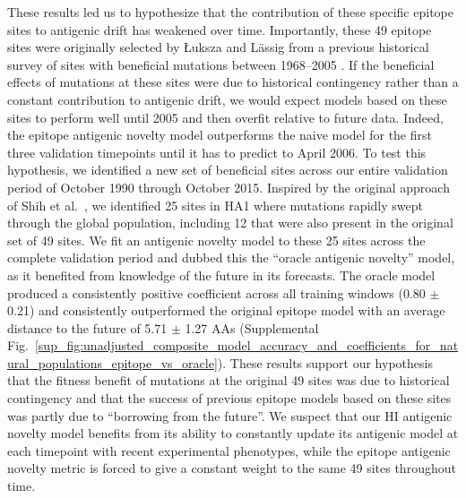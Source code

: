 These results led us to hypothesize that the contribution of these specific epitope sites to antigenic drift has weakened over time.
Importantly, these 49 epitope sites were originally selected by {\L}uksza and L\"assig \cite{Luksza:2014hj} from a previous historical survey of sites with beneficial mutations between 1968--2005 \cite{Shih:2007bd}.
If the beneficial effects of mutations at these sites were due to historical contingency rather than a constant contribution to antigenic drift, we would expect models based on these sites to perform well until 2005 and then overfit relative to future data.
Indeed, the epitope antigenic novelty model outperforms the naive model for the first three validation timepoints until it has to predict to April 2006.
To test this hypothesis, we identified a new set of beneficial sites across our entire validation period of October 1990 through October 2015.
Inspired by the original approach of Shih et al.~\cite{Shih:2007bd}, we identified 25 sites in HA1 where mutations rapidly swept through the global population, including 12 that were also present in the original set of 49 sites.
We fit an antigenic novelty model to these 25 sites across the complete validation period and dubbed this the ``oracle antigenic novelty'' model, as it benefited from knowledge of the future in its forecasts.
The oracle model produced a consistently positive coefficient across all training windows (0.80 $\pm$ 0.21) and consistently outperformed the original epitope model with an average distance to the future of 5.71 $\pm$ 1.27 AAs (Supplemental Fig.~\ref{sup_fig:unadjusted_composite_model_accuracy_and_coefficients_for_natural_populations_epitope_vs_oracle}).
These results support our hypothesis that the fitness benefit of mutations at the original 49 sites was due to historical contingency and that the success of previous epitope models based on these sites was partly due to ``borrowing from the future''.
We suspect that our HI antigenic novelty model benefits from its ability to constantly update its antigenic model at each timepoint with recent experimental phenotypes, while the epitope antigenic novelty metric is forced to give a constant weight to the same 49 sites throughout time.

